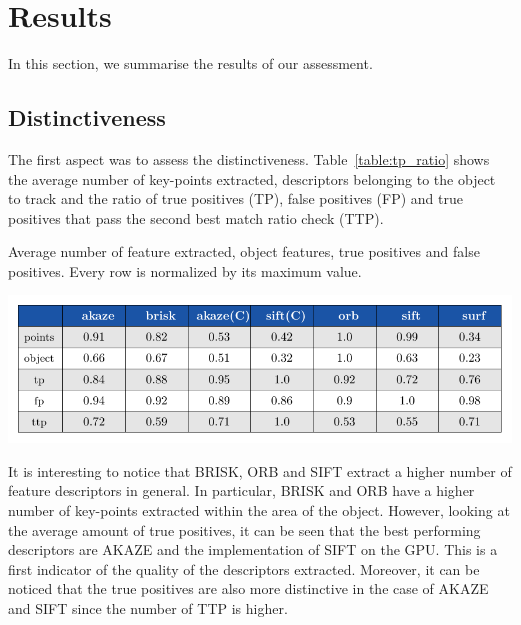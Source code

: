 \section{Results}

In this section, we summarise the results of our assessment.

\subsection{Distinctiveness}


The first aspect was to assess the distinctiveness. Table~\ref{table:tp_ratio} shows the average number of key-points extracted, descriptors belonging to the object to track and the ratio of true positives (TP), false positives (FP) and true positives that pass the second best match ratio check (TTP). 

\begin{table}[!h]
\caption{Average number of feature extracted, object features, true positives and false positives. Every row is normalized by its maximum value.}
\vspace{-2mm} 
\centerline{%
		\includegraphics[width=0.98\linewidth]{tables/descriptivness_ratio.pdf}}
    \vspace{-2mm} 
	\label{table:tp_ratio}
\end{table}

It is interesting to notice that BRISK, ORB and SIFT extract a higher number of feature descriptors in general. In particular, BRISK and ORB have a higher number of key-points extracted within the area of the object. However, looking at the average amount of true positives, it can be seen that the best performing descriptors are AKAZE and the implementation of SIFT on the GPU. This is a first indicator of the quality of the descriptors extracted. Moreover, it can be noticed that the true positives are also more distinctive in the case of AKAZE and SIFT since the number of TTP is higher.

